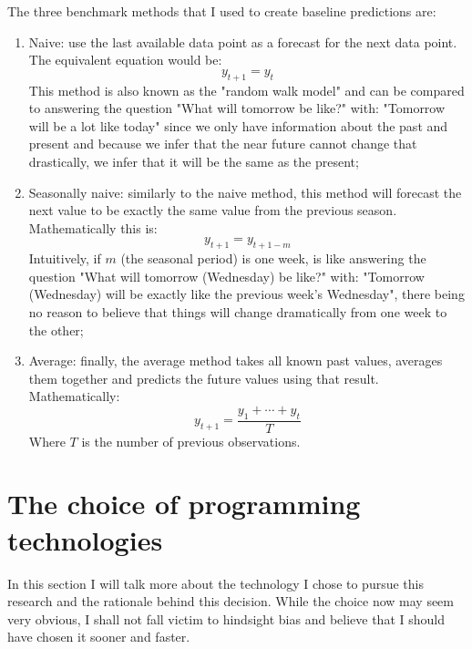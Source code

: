 \documentclass[12pt,a4paper,titlepage]{report}
\begin{document}
The three benchmark methods \cite{fpp2simplemethods} that I used to create baseline predictions are:
\begin{enumerate}
    \item Naive: use the last available data point as a forecast for the next data point. The equivalent equation would be: 
\begin{equation}
    y_{t+1} = y_{t}
\end{equation} 
    This method is also known as the "random walk model" and can be compared to answering the question "What will tomorrow be like?" with: "Tomorrow will be a lot like today" since we only have information about the past and present and because we infer that the near future cannot change that drastically, we infer that it will be the same as the present;
    \item Seasonally naive: similarly to the naive method, this method will forecast the next value to be exactly the same value from the previous season. Mathematically this is:
\begin{equation}
    y_{t+1} = y_{t+1-m}
\end{equation} 
    Intuitively, if $ m $ (the seasonal period) is one week, is like answering the question "What will tomorrow (Wednesday) be like?" with: "Tomorrow (Wednesday) will be exactly like the previous week's Wednesday", there being no reason to believe that things will change dramatically from one week to the other;
    \item Average: finally, the average method takes all known past values, averages them together and predicts the future values using that result. Mathematically:
\begin{equation}
    y_{t+1} = \frac{y_{1} + \cdots + y_{t}}{T}
\end{equation}
    Where $ T $ is the number of previous observations.
\end{enumerate}

\section{The choice of programming technologies}

In this section I will talk more about the technology I chose to pursue this research and the rationale behind this decision.
While the choice now may seem very obvious, I shall not fall victim to hindsight bias \cite{hindsightbias} and believe that I should have chosen it sooner and faster.
\end{document}
